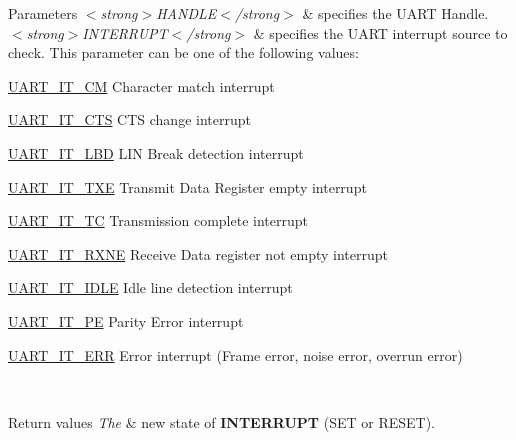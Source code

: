 \begin{DoxyParams}{Parameters}
{\em $<$strong$>$\+H\+A\+N\+D\+L\+E$<$/strong$>$} & specifies the U\+A\+RT Handle. \\
\hline
{\em $<$strong$>$\+I\+N\+T\+E\+R\+R\+U\+P\+T$<$/strong$>$} & specifies the U\+A\+RT interrupt source to check. This parameter can be one of the following values\+: \begin{DoxyItemize}
\item \mbox{\hyperlink{group___u_a_r_t___interrupt__definition_ga4c22e866bce68975a180828012489106}{U\+A\+R\+T\+\_\+\+I\+T\+\_\+\+CM}} Character match interrupt \item \mbox{\hyperlink{group___u_a_r_t___interrupt__definition_ga986d271478550f9afa918262ca642333}{U\+A\+R\+T\+\_\+\+I\+T\+\_\+\+C\+TS}} C\+TS change interrupt \item \mbox{\hyperlink{group___u_a_r_t___interrupt__definition_gabca5e77508dc2dd9aa26fcb683d9b988}{U\+A\+R\+T\+\_\+\+I\+T\+\_\+\+L\+BD}} L\+IN Break detection interrupt \item \mbox{\hyperlink{group___u_a_r_t___interrupt__definition_ga552636e2af516d578856f5ee2ba71ed7}{U\+A\+R\+T\+\_\+\+I\+T\+\_\+\+T\+XE}} Transmit Data Register empty interrupt \item \mbox{\hyperlink{group___u_a_r_t___interrupt__definition_gab9a4dc4e8cea354fd60f4117513b2004}{U\+A\+R\+T\+\_\+\+I\+T\+\_\+\+TC}} Transmission complete interrupt \item \mbox{\hyperlink{group___u_a_r_t___interrupt__definition_gac1bedf7a65eb8c3f3c4b52bdb24b139d}{U\+A\+R\+T\+\_\+\+I\+T\+\_\+\+R\+X\+NE}} Receive Data register not empty interrupt \item \mbox{\hyperlink{group___u_a_r_t___interrupt__definition_ga9781808d4f9999061fc2da36572191d9}{U\+A\+R\+T\+\_\+\+I\+T\+\_\+\+I\+D\+LE}} Idle line detection interrupt \item \mbox{\hyperlink{group___u_a_r_t___interrupt__definition_ga55f922ddcf513509710ade5d7c40a1db}{U\+A\+R\+T\+\_\+\+I\+T\+\_\+\+PE}} Parity Error interrupt \item \mbox{\hyperlink{group___u_a_r_t___interrupt__definition_ga8eb26d8edd9bf78ae8d3ad87dd51b618}{U\+A\+R\+T\+\_\+\+I\+T\+\_\+\+E\+RR}} Error interrupt (Frame error, noise error, overrun error) \end{DoxyItemize}
\\
\hline
\end{DoxyParams}

\begin{DoxyRetVals}{Return values}
{\em The} & new state of {\bfseries{I\+N\+T\+E\+R\+R\+U\+PT}} (S\+ET or R\+E\+S\+ET). \\
\hline
\end{DoxyRetVals}
\mbox{\label{group___u_a_r_t___exported___macros_ga0a26cb3a576c2700f76a7c697c86a499}} 
